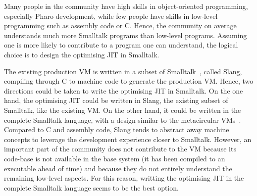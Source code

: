 \documentclass[a4paper,12pt,twoside]{../includes/ThesisStyle}
\begin{document}
Many people in the community have high skills in object-oriented programming, especially Pharo development, while few people have skills in low-level programming such as assembly code or C. Hence, the community on average understands much more Smalltalk programs than low-level programs. Assuming one is more likely to contribute to a program one can understand, the logical choice is to design the optimising JIT in Smalltalk.

The existing production VM is written in a subset of Smalltalk~\cite{Inga97a}, called Slang, compiling through C to machine code to generate the production VM. Hence, two directions could be taken to write the optimising JIT in Smalltalk. On the one hand, the optimising JIT could be written in Slang, the existing subset of Smalltalk, like the existing VM. On the other hand, it could be written in the complete Smalltalk language, with a design similar to the metacircular VMs~\cite{Unga05b,Wimm13a,Alp99a}. Compared to C and assembly code, Slang tends to abstract away machine concepts to leverage the development experience closer to Smalltalk. However, an important part of the community does not contribute to the VM because its code-base is not available in the base system (it has been compiled to an executable ahead of time) and because they do not entirely understand the remaining low-level aspects. For this reason, writting the optimising JIT in the complete Smalltalk language seems to be the best option.

\end{document}
